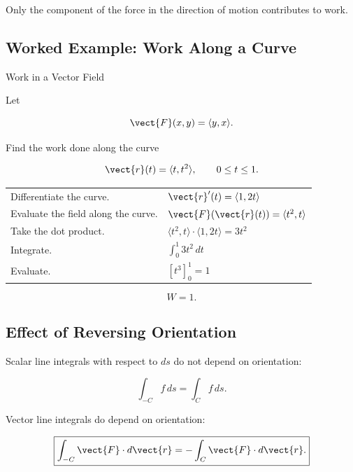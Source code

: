 Only the component of the force in the direction of motion contributes to
work.

\subsection{Worked Example: Work Along a Curve}
\label{subsec:worked-work-line-integral}

\begin{workedexamplebox}{Work in a Vector Field}

Let

\[ \vect{F}(x,y)=\langle y,x\rangle. \]

Find the work done along the curve

\[ \vect{r}(t)=\langle t,t^2\rangle,\qquad0\leq t\leq1. \]

\begin{tabularx}{\textwidth}{@{}>{\raggedright\arraybackslash}p{}X@{}}
Differentiate the curve. &
\(\vect{r}'(t)=\langle1,2t\rangle\)\\
Evaluate the field along the curve. &
\(\vect{F}(\vect{r}(t))=\langle t^2,t\rangle\)\\
Take the dot product. &
\(\langle t^2,t\rangle\cdot\langle1,2t\rangle=3t^2\)\\
Integrate. &
\(\displaystyle \int_0^1 3t^2\,dt\)\\
Evaluate. &
\(\displaystyle [t^3]_0^1=1\)
\end{tabularx}

\begin{answerbox}
\[ \boxed{W=1.} \]
\end{answerbox}
\end{workedexamplebox}

\subsection{Effect of Reversing Orientation}
\label{subsec:reversing-line-orientation}

Scalar line integrals with respect to \(ds\) do not depend on orientation:

\[ \int_{-C}f\,ds=\int_Cf\,ds. \]

Vector line integrals do depend on orientation:

\[ \boxed{\int_{-C}\vect{F}\cdot d\vect{r}
=-\int_C\vect{F}\cdot d\vect{r}.} \]

